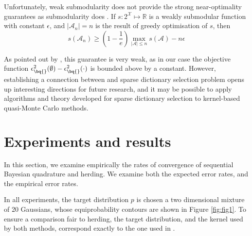 Unfortunately, weak submodularity does not provide the strong near-optimality guarantees as submodularity does . If $s:2^\mathcal{X} \mapsto \mathbb{R}$ is a weakly submodular function with constant $\epsilon$, and $\vert\mathcal{A}_n\vert=n$ is the result of greedy optimisation of $s$, then
\begin{equation}
	s(\mathcal{A}_n) \geq \left(1-\frac{1}{e}\right)\max_{\vert\mathcal{A}\vert\leq n}s(\mathcal{A}) - n\epsilon
\end{equation}

As pointed out by \citet{KrauseCevher10}, this guarantee is very weak, as in our case the objective function $\epsilon^{2}_{\bq{}}(\emptyset)-\epsilon^{2}_{\bq{}}(\cdot)$ is bounded above by a constant. However, establishing a connection between \sbq{} and sparse dictionary selection problem opens up interesting directions for future research, and it may be possible to apply algorithms and theory developed for sparse dictionary selection to kernel-based quasi-Monte Carlo methods.


\section{Experiments and results}\label{sec:herding_experiments}

In this section, we examine empirically the rates of convergence of sequential Bayesian quadrature and herding. We examine both the expected error rates, and the empirical error rates.

In all experiments, the target distribution $p$ is chosen a two dimensional mixture of 20 Gaussians, whose equiprobability contours are shown in Figure \ref{fig:fig1}. To ensure a comparison fair to herding, the target distribution, and the kernel used by both methods, correspond exactly to the one used in \citep[Fig.\ 1]{Chen2010}.

